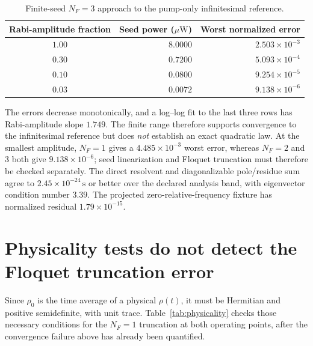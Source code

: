 \documentclass[11pt,a4paper]{article}
\begin{document}
\begin{table}[ht]
\centering
\caption{Finite-seed $N_F=3$ approach to the pump-only infinitesimal reference.}
\label{tab:finite-seed-reference-limit}
\small
\begin{tabular}{c r r}
\toprule
Rabi-amplitude fraction & Seed power ($\mu\mathrm W$) & Worst normalized error\\
\midrule
$1.00$ & $8.0000$ & $2.503\times10^{-3}$\\
$0.30$ & $0.7200$ & $5.093\times10^{-4}$\\
$0.10$ & $0.0800$ & $9.254\times10^{-5}$\\
$0.03$ & $0.0072$ & $9.138\times10^{-6}$\\
\bottomrule
\end{tabular}
\end{table}

The errors decrease monotonically, and a log--log fit to the last three rows
has Rabi-amplitude slope $1.749$. The finite range therefore supports
convergence to the infinitesimal reference but does \emph{not} establish an
exact quadratic law. At the smallest amplitude, $N_F=1$ gives a
$4.485\times10^{-3}$ worst error, whereas $N_F=2$ and 3 both give
$9.138\times10^{-6}$; seed linearization and Floquet truncation must therefore
be checked separately. The direct resolvent and diagonalizable pole/residue
sum agree to $2.45\times10^{-24}\,\mathrm{s}$ or better over the declared
analysis band, with eigenvector condition number $3.39$. The projected
zero-relative-frequency fixture has normalized residual
$1.79\times10^{-15}$.

\section{Physicality tests do not detect the Floquet truncation error}
\label{sec:physicality-blind}

Since $\rho_0$ is the time average of a physical $\rho(t)$, it must be
Hermitian and positive semidefinite, with unit trace. Table~\ref{tab:physicality}
checks those necessary conditions for the $N_F=1$ truncation at both operating
points, after the convergence failure above has already been quantified.
\end{document}
